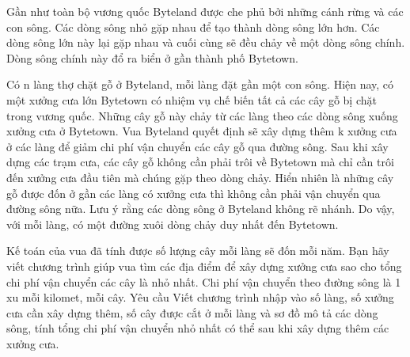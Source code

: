 Gần như toàn bộ vương quốc Byteland được che phủ bởi những cánh rừng và các con sông. Các dòng sông nhỏ gặp nhau để tạo thành dòng sông lớn hơn. Các dòng sông lớn này lại gặp nhau và cuối cùng sẽ đều chảy về một dòng sông chính. Dòng sông chính này đổ ra biển ở gần thành phố Bytetown.  

   Có n làng thợ chặt gỗ ở Byteland, mỗi làng đặt gần một con sông. Hiện nay, có một xưởng cưa lớn Bytetown có nhiệm vụ chế biến tất cả các cây gỗ bị chặt trong vương quốc. Những cây gỗ này chảy từ các làng theo các dòng sông xuống xưởng cưa ở Bytetown. Vua Byteland quyết định sẽ xây dựng thêm k xưởng cưa ở các làng để giảm chi phí vận chuyển các cây gỗ qua đường sông. Sau khi xây dựng các trạm cưa, các cây gỗ không cần phải trôi về Bytetown mà chỉ cần trôi đến xưởng cưa đầu tiên mà chúng gặp theo dòng chảy. Hiển nhiên là những cây gỗ được đốn ở gần các làng có xưởng cưa thì không cần phải vận chuyển qua đường sông nữa. Lưu ý rằng các dòng sông ở Byteland không rẽ nhánh. Do vậy, với mỗi làng, có một đường xuôi dòng chảy duy nhất đến Bytetown.  

   Kế toán của vua đã tính được số lượng cây mỗi làng sẽ đốn mỗi năm. Bạn hãy viết chương trình giúp vua tìm các địa điểm để xây dựng xưởng cưa sao cho tổng chi phí vận chuyển các cây là nhỏ nhất. Chi phí vận chuyển theo đường sông là 1 xu mỗi kilomet, mỗi cây.
Yêu cầu
Viết chương trình nhập vào số làng, số xưởng cưa cần xây dựng thêm, số cây được cắt ở mỗi làng và sơ đồ mô tả các dòng sông, tính tổng chi phí vận chuyển nhỏ nhất có thể sau khi xây dựng thêm các xưởng cưa.